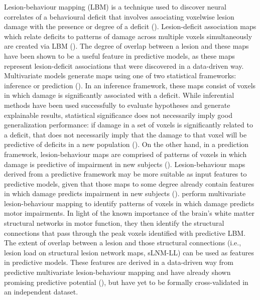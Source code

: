 \documentclass[10pt]{article}
\begin{document}
Lesion-behaviour mapping (LBM) is a technique used to discover neural correlates of a behavioural deficit that involves associating voxelwise lesion damage with the presence or degree of a deficit (\cite{Bates2003-eg,Karnath2020-cg}). Lesion-deficit association maps which relate deficits to patterns of damage across multiple voxels simultaneously are created via LBM (\cite{Pustina2018-xv, Zhang2014-jd}). The degree of overlap between a lesion and these maps have been shown to be a useful feature in predictive models, as these maps represent lesion-deficit associations that were discovered in a data-driven way. Multivariate models generate maps using one of two statistical frameworks: inference or prediction (\cite{Sperber2022-oj, Bzdok2020-py}). In an inference framework, these maps consist of voxels in which damage is significantly associated with a deficit. While inferential methods have been used successfully to evaluate hypotheses and generate explainable results, statistical significance does not necessarily imply good generalization performance: if damage in a set of voxels is significantly related to a deficit, that does not necessarily imply that the damage to that voxel will be predictive of deficits in a new population (\cite{Bzdok2020-py}). On the other hand, in a prediction framework, lesion-behaviour maps are comprised of patterns of voxels in which damage is predictive of impairment in new subjects (\cite{Bowren2022-rs, Mah2014-cb,Rondina2017-ij, Sperber2020-kp}). Lesion-behaviour maps derived from a predictive framework may be more suitable as input features to predictive models, given that those maps to some degree already contain features in which damage predicts impairment in new subjects (\cite{Zhang2014-jd}). \cite{Bowren2022-rs} perform multivariate lesion-behaviour mapping to identify patterns of voxels in which damage predicts motor impairments. In light of the known importance of the brain's white matter structural networks in motor function, they then identify the structural connections that pass through the peak voxels identified with predictive LBM. The extent of overlap between a lesion and those structural connections (i.e., lesion load on structural lesion network maps, sLNM-LL) can be used as features in predictive models. These features are derived in a data-driven way from predictive multivariate lesion-behaviour mapping and have already shown promising predictive potential (\cite{Bowren2022-rs}), but have yet to be formally cross-validated in an independent dataset. 
\end{document}
